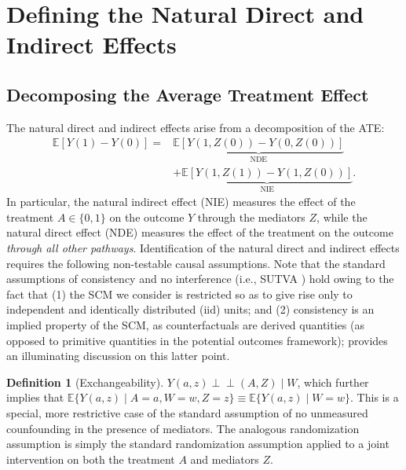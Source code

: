 \documentclass[
  12pt, krantz2,
]{krantz}
\newcommand{\E}{\mathbb{E}}
\newcommand{\1}{\mathbbm{1}}
\newcommand{\indep}{\mbox{$\perp\!\!\!\perp$}}
\theoremstyle{definition}
\newtheorem{definition}{Definition}[chapter]
\theoremstyle{definition}
\theoremstyle{definition}
\theoremstyle{definition}
\theoremstyle{remark}
\begin{document}
\hypertarget{defining-the-natural-direct-and-indirect-effects}{%
\section{Defining the Natural Direct and Indirect Effects}\label{defining-the-natural-direct-and-indirect-effects}}

\hypertarget{decomposing-the-average-treatment-effect}{%
\subsection{Decomposing the Average Treatment Effect}\label{decomposing-the-average-treatment-effect}}

The natural direct and indirect effects arise from a decomposition of the ATE:
\begin{align*}
  \E[Y(1) - Y(0)] =
    &\underbrace{\E[Y(1, Z(0)) - Y(0, Z(0))]}_{\text{NDE}} \\ &+
    \underbrace{\E[Y(1, Z(1)) - Y(1, Z(0))]}_{\text{NIE}}.
\end{align*}
In particular, the natural indirect effect (NIE) measures the effect of the
treatment \(A \in \{0, 1\}\) on the outcome \(Y\) through the mediators \(Z\), while
the natural direct effect (NDE) measures the effect of the treatment on the
outcome \emph{through all other pathways}. Identification of the natural direct and
indirect effects requires the following non-testable causal assumptions. Note
that the standard assumptions of consistency and no interference (i.e., SUTVA
\citep{rubin1978bayesian, rubin1980randomization}) hold owing to the fact that (1)
the SCM we consider is restricted so as to give rise only to independent and
identically distributed (iid) units; and (2) consistency is an implied property
of the SCM, as counterfactuals are derived quantities (as opposed to primitive
quantities in the potential outcomes framework); \citet{pearl2010brief} provides an
illuminating discussion on this latter point.

\begin{definition}[Exchangeability]
\(Y(a, z) \indep (A, Z) \mid W\), which further implies that \(\E\{Y(a, z) \mid A=a, W=w, Z=z\} \equiv \E\{Y(a, z) \mid W=w\}\). This is a special, more
restrictive case of the standard assumption of no unmeasured counfounding in the
presence of mediators. The analogous randomization assumption is simply the
standard randomization assumption applied to a joint intervention on both the
treatment \(A\) and mediators \(Z\).
\end{definition}
\end{document}
